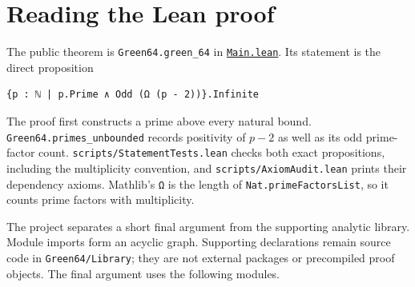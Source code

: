 \hypertarget{lean-guide}{%
\section{Reading the Lean proof}\label{lean-guide}}

The public theorem is {\small\nolinkurl{Green64.green_64}} in
\href{../Green64/Main.lean}{\nolinkurl{Main.lean}}. Its statement is the
direct proposition

\begin{verbatim}
{p : ℕ | p.Prime ∧ Odd (Ω (p - 2))}.Infinite
\end{verbatim}

The proof first constructs a prime above every natural bound.
{\small\nolinkurl{Green64.primes_unbounded}} records positivity of
\(p-2\) as well as its odd prime-factor count.
{\small\nolinkurl{scripts/StatementTests.lean}} checks both exact
propositions, including the multiplicity convention, and
{\small\nolinkurl{scripts/AxiomAudit.lean}} prints their dependency
axioms. Mathlib's {\small\nolinkurl{Ω}} is the length of
{\small\nolinkurl{Nat.primeFactorsList}}, so it counts prime factors
with multiplicity.

The project separates a short final argument from the supporting
analytic library. Module imports form an acyclic graph. Supporting
declarations remain source code in {\small\nolinkurl{Green64/Library}};
they are not external packages or precompiled proof objects. The final
argument uses the following modules.

